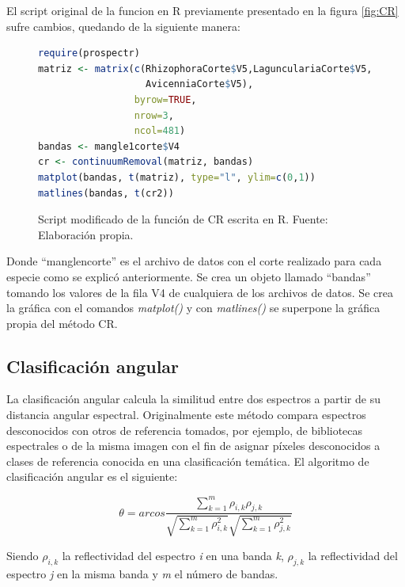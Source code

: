 El script original de la funcion en R previamente presentado en la figura \ref{fig:CR} sufre cambios, quedando de la siguiente manera:\SmallSep

\begin{figure}[ht]
	\centering
	\begin{lstlisting}[language = R, frame = single]
require(prospectr)
matriz <- matrix(c(RhizophoraCorte$V5,LagunculariaCorte$V5,
                   AvicenniaCorte$V5),
                 byrow=TRUE,
                 nrow=3,
                 ncol=481)
bandas <- mangle1corte$V4
cr <- continuumRemoval(matriz, bandas)
matplot(bandas, t(matriz), type="l", ylim=c(0,1))
matlines(bandas, t(cr2))
	\end{lstlisting}
	\caption[Función modificada de CR]{Script modificado de la función de CR escrita en R. Fuente: Elaboración propia.}
	\label{fig:CRmodificado}
\end{figure}	

Donde ``manglencorte'' es el archivo de datos con el corte realizado para cada especie como se explicó anteriormente. Se crea un objeto llamado ``bandas'' tomando los valores de la fila V4 de cualquiera de los archivos de datos. Se crea la gráfica con el comandos \textit{matplot()} y con \textit{matlines()} se superpone la gráfica propia del método \ac{CR}.\Sep

\subsection{Clasificación angular}
La clasificación angular calcula la similitud entre dos espectros a partir de su distancia angular espectral. Originalmente este método compara espectros desconocidos con otros de referencia tomados, por ejemplo, de bibliotecas espectrales o de la misma imagen \citep{girouard2004validated} con el fin de asignar píxeles desconocidos a clases de referencia conocida en una clasificación temática. El algoritmo de clasificación angular es el siguiente:

\begin{equation} \label{eq:angular}
	\theta = arcos \frac{\sum_{k=1}^{m} \rho_{i,k} \rho_{j,k}}{\sqrt{\sum_{k=1}^{m} \rho_{i,k}^{2}} \sqrt{\sum_{k=1}^{m} \rho_{j,k}^{2}}}
\end{equation}\Sep

Siendo $\rho_{i,k}$ la reflectividad del espectro \textit{i} en una banda \textit{k}, $\rho_{j,k}$ la reflectividad del espectro \textit{j} en la misma banda y \textit{m} el número de bandas.\Sep

